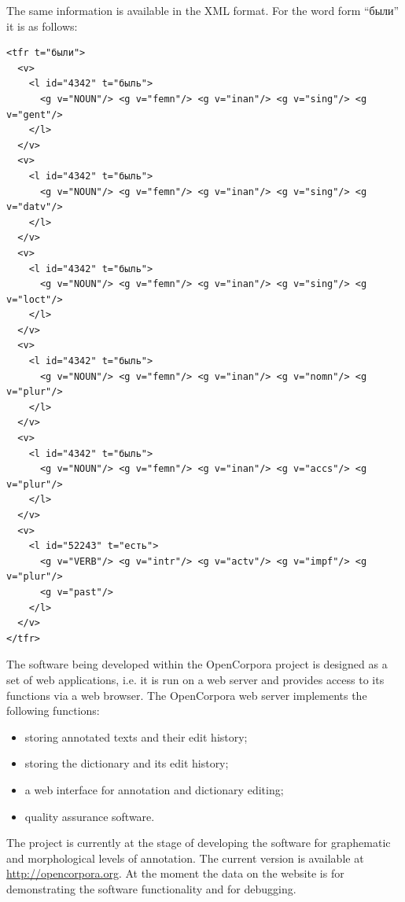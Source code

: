 \documentclass[a4paper]{article}
\begin{document}
The same information is available in the XML format. For the word form ``были'' it is as follows:
\begin{verbatim}
<tfr t="были">
  <v>
    <l id="4342" t="быль">
      <g v="NOUN"/> <g v="femn"/> <g v="inan"/> <g v="sing"/> <g v="gent"/>
    </l>
  </v>
  <v>
    <l id="4342" t="быль">
      <g v="NOUN"/> <g v="femn"/> <g v="inan"/> <g v="sing"/> <g v="datv"/>
    </l>
  </v>
  <v>
    <l id="4342" t="быль">
      <g v="NOUN"/> <g v="femn"/> <g v="inan"/> <g v="sing"/> <g v="loct"/>
    </l>
  </v>
  <v>
    <l id="4342" t="быль">
      <g v="NOUN"/> <g v="femn"/> <g v="inan"/> <g v="nomn"/> <g v="plur"/>
    </l>
  </v>
  <v>
    <l id="4342" t="быль">
      <g v="NOUN"/> <g v="femn"/> <g v="inan"/> <g v="accs"/> <g v="plur"/>
    </l>
  </v>
  <v>
    <l id="52243" t="есть">
      <g v="VERB"/> <g v="intr"/> <g v="actv"/> <g v="impf"/> <g v="plur"/>
      <g v="past"/>
    </l>
  </v>
</tfr>
\end{verbatim}
The software being developed within the OpenCorpora project is designed as a set of web applications, i.e. it is run on a web server and provides access to its functions via a web browser. The OpenCorpora web server implements the following functions:
\begin{itemize}
\item storing annotated texts and their edit history;
\item storing the dictionary and its edit history;
\item a web interface for annotation and dictionary editing;
\item quality assurance software.
\end{itemize}

The project is currently at the stage of developing the software for graphematic and morphological levels of annotation. The current version is available at \url{http://opencorpora.org}. At the moment the data on the website is for demonstrating the software functionality and for debugging.
\end{document}
